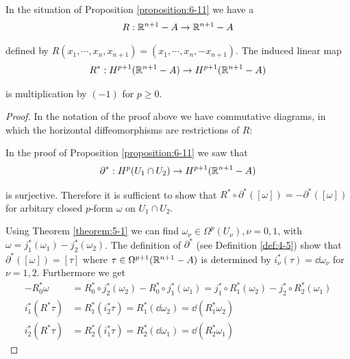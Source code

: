 \begin{addendum}\label{addendum:6-12}
  In the situation of Proposition \ref{proposition:6-11} we have a 
  \begin{align*}
    R:\mathbb{R}^{n+1}-A \to \mathbb{R}^{n+1}-A
  \end{align*}

  defined by $R(x_1, \cdots, x_n, x_{n+1}) = (x_1, \cdots, x_n, -x_{n+1})$. The induced linear map
  \begin{align*}
    R^*:H^{p+1}(\mathbb{R}^{n+1} -A) \to H^{p+1}(\mathbb{R}^{n+1} - A)
  \end{align*}

  is multiplication by $(-1)$ for $p\ge 0$.
\end{addendum}

\begin{proof}
  In the notation of the proof above we have commutative diagrams, in
which the horizontal diffeomorphisms are restrictions of $R$:
\begin{center}
  \hspace*{3em}
\end{center}

In the proof of Proposition \ref{proposition:6-11} we saw that
\begin{align*}
  \partial^*:H^p(U_1\cap U_2)\to H^{p+1}(\mathbb{R}^{n+1}-A)
\end{align*}

is surjective. Therefore it is sufficient to show that $R^*\circ\partial^*([\omega]) = -\partial^*([\omega])$
for arbitary closed $p$-form $\omega$ on $U_1\cap U_2$.

Using Theorem \ref{theorem:5-1} we can find $\omega_\nu\in\Omega^p(U_\nu),\nu=0,1$, with $\omega=j_1^*(\omega_1) -
j_2^*(\omega_2)$. The definition of $\partial^*$ (see Definition \ref{def:4-5}) show that $\partial^*([\omega]) = [\tau]$
where $\tau\in\Omega^{p+1}(\mathbb{R}^{n+1} - A)$ is determined by $i^*_\nu(\tau) = \dd\omega_\nu$ for $\nu=1, 2$. Furthermore we get 
\begin{align*}
  -R^*_0\omega & = R^*_0\circ j^*_2(\omega_2) - R^*_0\circ j^*_1(\omega_1) 
      = j^*_1\circ R^*_1(\omega_2) - j^*_2\circ R^*_2(\omega_1) \\
  i^*_1(R^*\tau) & = R^*_1(i^*_2\tau) = R^*_1(\dd\omega_2) = \dd(R^*_1\omega_2) \\
  i^*_2(R^*\tau) & = R^*_2(i^*_1\tau) = R^*_2(\dd\omega_1) = \dd(R^*_2\omega_1)
\end{align*}


\end{proof}

